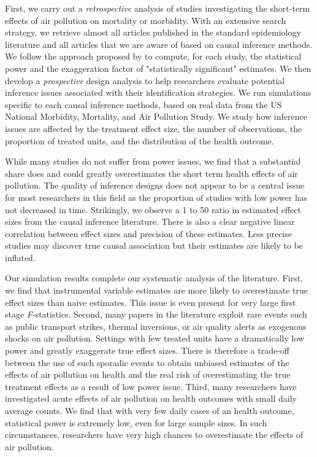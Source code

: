 \documentclass[12pt]{article}
\begin{document}
    First, we carry out a \textit{retrospective} analysis of studies investigating the short-term effects of air pollution on mortality or morbidity. With an extensive search strategy, we retrieve almost all articles published in the standard epidemiology literature and all articles that we are aware of based on causal inference methods. We follow the approach proposed by \cite{gelman_beyond_2014} to compute, for each study, the statistical power and the exaggeration factor of "statistically significant" estimates. We then develop a \textit{prospective} design analysis to help researchers evaluate potential inference issues associated with their identification strategies. We run simulations specific to each causal inference methods, based on real data from the US National Morbidity, Mortality, and Air Pollution Study. We study how inference issues are affected by the treatment effect size, the number of observations, the proportion of treated units, and the distribution of the health outcome.
    
    While many studies do not suffer from power issues, we find that a substantial share does and could greatly overestimates the short term health effects of air pollution. The quality of inference designs does not appear to be a central issue for most researchers in this field as the proportion of studies with low power has not decreased in time. Strikingly, we observe a 1 to 50 ratio in estimated effect sizes from the causal inference literature. There is also a clear negative linear correlation between effect sizes and precision of these estimates. Less precise studies may discover true causal association but their estimates are likely to be inflated. 
    
    Our simulation results complete our systematic analysis of the literature. First, we find that instrumental variable estimates are more likely to overestimate true effect sizes than naive estimates. This issue is even present for very large first stage \textit{F}-statistics. Second,  many papers in the literature exploit rare events such as public transport strikes, thermal inversions, or air quality alerts as exogenous shocks on air pollution. Settings with few treated units have a dramatically low power and greatly exaggerate true effect sizes. There is therefore a trade-off between the use of such sporadic events to obtain unbiased estimates of the effects of air pollution on health and the real risk of overestimating the true treatment effects as a result of low power issue. Third, many researchers have investigated acute effects of air pollution on health outcomes with small daily average counts. We find that with very few daily cases of an health outcome, statistical power is extremely low, even for large sample sizes. In such circumstances, researchers have very high chances to overestimate the effects of air pollution.
    
\end{document}
